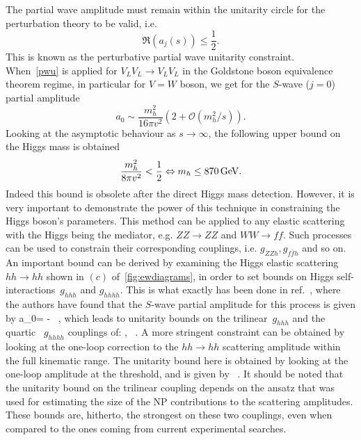 The partial wave amplitude must  remain within the unitarity circle for the perturbation theory to be valid, i.e.
\begin{equation}
	\mathfrak{R} (a_j(s)) \leq \frac{1}{2}.
	\label{pwu}
\end{equation}
This is known as the perturbative partial wave unitarity constraint.  \\
When~\eqref{pwu} is applied for  $V_L V_L \to V_L V_L$ in the Goldstone boson equivalence theorem regime, in particular for $V=W$ boson, we get for the $S$-wave ($j=0$) partial amplitude
\begin{equation}
	a_0 \sim \frac{m_h^2}{16 \pi  v^2} \left( 2+\mathcal{O} \left(m_h^2/s \right) \right) .
\end{equation}
Looking at the asymptotic behaviour as $ s \to \infty$, the following upper bound on the Higgs mass is obtained
\begin{equation}
	\frac{m_h^2}{8 \pi v^2} < {1\over 2}  \Leftrightarrow  m_h \leq 870 \,\GeV.
\end{equation}
Indeed this bound is obsolete  after the direct Higgs mass detection. However, it is very important to demonstrate the power of this technique in constraining the Higgs boson's parameters. This method can be applied to any elastic scattering with the Higgs  being  the mediator, e.g.  $ZZ\to ZZ$ and  $WW \to ff$. Such processes can be used to constrain their corresponding couplings, i.e. $ g_{ZZh}, g_{f\bar f h}$ and so on. An important bound can be derived by examining the Higgs elastic scattering~$hh \to hh$ shown in $(c)$ of~\autoref{fig:ewdiagrams}, in order to set bounds on Higgs self-interactions~$g_{hhh}$ and $g_{hhhh}$. This is what exactly has been done in ref.~\cite{DiLuzio:2017tfn}, where the authors have found that the $S$-wave partial amplitude for this process is given by
\beq 
\label{a0hhtohh}
a_0= -    \, ,
\eeq
which leads to unitarity bounds on the trilinear~$g_{hhh}$ and the quartic ~$g_{hhhh}$ couplings of:
\beq
\label{unitaritybounds}
 , 
\qquad {} \qquad
{}  \, .
\eeq
A more stringent constraint can be obtained by looking at the one-loop correction to the $hh\to hh$ scattering amplitude within the full kinematic range.
The unitarity bound here is obtained by looking at the one-loop  amplitude at the threshold, and is given by
\beq 
\label{pertboundhhhmax}
  \, .
\eeq
It should be noted that the unitarity bound on the trilinear coupling depends on the ansatz that was used for estimating the size of the NP contributions to the scattering amplitudes.
These bounds are, hitherto, the strongest on these two couplings, even when compared to the ones coming from current experimental searches. 

